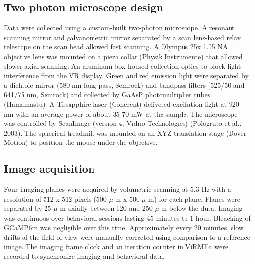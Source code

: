 \subsection{Two photon microscope design} 
Data were collected using a custom-built two-photon microscope. A resonant scanning mirror and galvanometric mirror separated by a scan lens-based relay telescope on the scan head allowed fast scanning. A Olympus 25x 1.05 NA objective lens was mounted on a piezo collar (Physik Instrumente) that allowed slower axial scanning. An aluminum box housed collection optics to block light interference from the VR display. Green and red emission light were separated by a dichroic mirror (580 nm long-pass, Semrock) and bandpass filters (525/50 and 641/75 nm, Semrock) and collected by GaAsP photomultiplier tubes (Hamamastu). A Ti:sapphire laser (Coherent) delivered excitation light at 920 nm with an average power of about 35-70 mW at the sample. The microscope was controlled by ScanImage (version 4; Vidrio Technologies) (Pologruto et al., 2003). The spherical treadmill was mounted on an XYZ translation stage (Dover Motion) to position the mouse under the objective.

\subsection{Image acquisition}
Four imaging planes were acquired by volumetric scanning at 5.3 Hz with a resolution of 512 x 512 pixels (500 $\mu$ m x 500 $\mu$ m) for each plane. Planes were separated by 25 $\mu$ m axially between 120 and 250 $\mu$ m below the dura. Imaging was continuous over behavioral sessions lasting 45 minutes to 1 hour. Bleaching of GCaMP6m was negligible over this time. Approximately every 20 minutes, slow drifts of the field of view were manually corrected using comparison to a reference image. The imaging frame clock and an iteration counter in ViRMEn were recorded to synchronize imaging and behavioral data.

